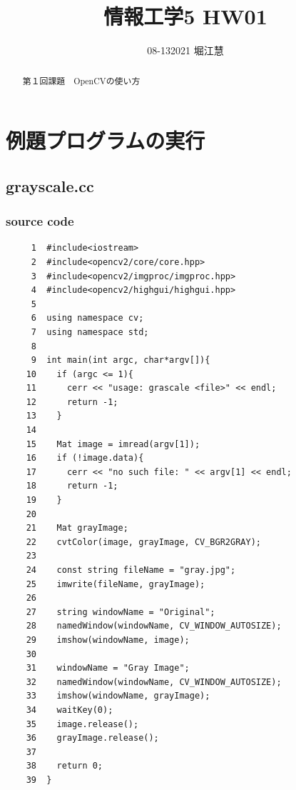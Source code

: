 \documentclass{jsarticle}
\begin{document}
\title{情報工学5 HW01}
\author{08-132021 堀江慧}
\date{}
\maketitle{}

\begin{abstract}
\begin{center}
第１回課題　OpenCVの使い方
\end{center}
\end{abstract}

\section{例題プログラムの実行}

\subsection{grayscale.cc}

\subsubsection{source code}
\begin{verbatim}
     1	#include<iostream>
     2	#include<opencv2/core/core.hpp>
     3	#include<opencv2/imgproc/imgproc.hpp>
     4	#include<opencv2/highgui/highgui.hpp>
     5	
     6	using namespace cv;
     7	using namespace std;
     8	
     9	int main(int argc, char*argv[]){
    10	  if (argc <= 1){
    11	    cerr << "usage: grascale <file>" << endl;
    12	    return -1;
    13	  }
    14	
    15	  Mat image = imread(argv[1]);
    16	  if (!image.data){
    17	    cerr << "no such file: " << argv[1] << endl;
    18	    return -1;
    19	  }
    20	
    21	  Mat grayImage;
    22	  cvtColor(image, grayImage, CV_BGR2GRAY);
    23	
    24	  const string fileName = "gray.jpg";
    25	  imwrite(fileName, grayImage);
    26	
    27	  string windowName = "Original";
    28	  namedWindow(windowName, CV_WINDOW_AUTOSIZE);
    29	  imshow(windowName, image);
    30	
    31	  windowName = "Gray Image";
    32	  namedWindow(windowName, CV_WINDOW_AUTOSIZE);
    33	  imshow(windowName, grayImage);
    34	  waitKey(0);
    35	  image.release();
    36	  grayImage.release();
    37	
    38	  return 0;
    39	}
\end{verbatim}
\end{document}
